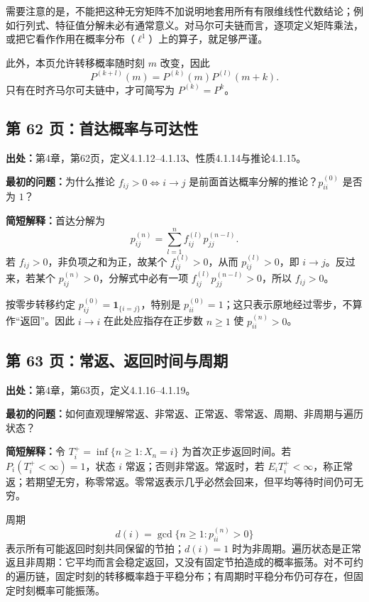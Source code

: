 \documentclass[11pt,a4paper]{ctexart}
\begin{document}
需要注意的是，不能把这种无穷矩阵不加说明地套用所有有限维线性代数结论；例如行列式、特征值分解未必有通常意义。对马尔可夫链而言，逐项定义矩阵乘法，或把它看作作用在概率分布（$\ell^1$）上的算子，就足够严谨。

此外，本页允许转移概率随时刻 $m$ 改变，因此
\[
 P^{(k+l)}(m)=P^{(k)}(m)P^{(l)}(m+k).
\]
只有在时齐马尔可夫链中，才可简写为 $P^{(k)}=P^k$。


\subsection{第 62 页：首达概率与可达性}
\label{note:sp-markov-first-hit-accessibility}
\textbf{出处：}第4章，第62页，定义4.1.12--4.1.13、性质4.1.14与推论4.1.15。

\textbf{最初的问题：}为什么推论 $f_{ij}>0\Longleftrightarrow i\to j$ 是前面首达概率分解的推论？$p_{ii}^{(0)}$ 是否为 $1$？

\textbf{简短解释：}首达分解为
\[
 p_{ij}^{(n)}=\sum_{l=1}^n f_{ij}^{(l)}p_{jj}^{(n-l)}.
\]
若 $f_{ij}>0$，非负项之和为正，故某个 $f_{ij}^{(l)}>0$，从而 $p_{ij}^{(l)}>0$，即 $i\to j$。反过来，若某个 $p_{ij}^{(n)}>0$，分解式中必有一项 $f_{ij}^{(l)}p_{jj}^{(n-l)}>0$，所以 $f_{ij}>0$。

按零步转移约定 $p_{ij}^{(0)}=\mathbf 1_{\{i=j\}}$，特别是 $p_{ii}^{(0)}=1$；这只表示原地经过零步，不算作“返回”。因此 $i\to i$ 在此处应指存在正步数 $n\ge1$ 使 $p_{ii}^{(n)}>0$。

\subsection{第 63 页：常返、返回时间与周期}
\label{note:sp-markov-recurrence-period}
\textbf{出处：}第4章，第63页，定义4.1.16--4.1.19。

\textbf{最初的问题：}如何直观理解常返、非常返、正常返、零常返、周期、非周期与遍历状态？

\textbf{简短解释：}令 $T_i^+=\inf\{n\ge1:X_n=i\}$ 为首次正步返回时间。若 $P_i(T_i^+<\infty)=1$，状态 $i$ 常返；否则非常返。常返时，若 $E_iT_i^+<\infty$，称正常返；若期望无穷，称零常返。零常返表示几乎必然会回来，但平均等待时间仍可无穷。

周期
\[
 d(i)=\gcd\{n\ge1:p_{ii}^{(n)}>0\}
\]
表示所有可能返回时刻共同保留的节拍；$d(i)=1$ 时为非周期。遍历状态是正常返且非周期：它平均而言会稳定返回，又没有固定节拍造成的概率振荡。对不可约的遍历链，固定时刻的转移概率趋于平稳分布；有周期时平稳分布仍可存在，但固定时刻概率可能振荡。
\end{document}
